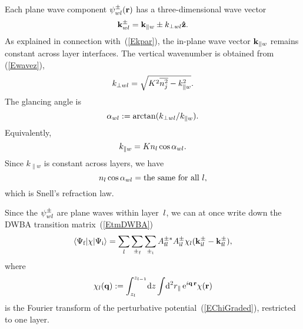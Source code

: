 Each plane wave component $\psi^\pm_{wl}(\mathbf{r})$ has
a three-dimensional wave vector
\begin{equation}\label{Ekpmwj3}
  \mathbf{k}^\pm_{wl}= \mathbf{k}_{\parallel w} \pm k_{\perp wl}\mathbf{\hat z}.
\end{equation}
%
%
As explained in connection with~(\ref{Ekpar}),
the in-plane wave vector $\mathbf{k}_{\parallel w}$ remains constant
across layer interfaces.
The vertical wavenumber is obtained from (\ref{Ewavez}),
\begin{equation}\label{Ekperpwj}
  k_{\perp wl} = \sqrt{K^2 \overline{n_j^2} - k_{\parallel w}^2}.
\end{equation}
The glancing angle is
\begin{equation}\label{Edef_alpha}
  \alpha_{wl}:=\arctan(k_{\perp wl}/k_{\parallel w}).  
\end{equation}
Equivalently,
\begin{equation}
  k_{\parallel w}=K n_l \cos\alpha_{wl}. 
\end{equation}
Since $k_{\parallel w}$ is constant across layers,
we have
\begin{equation}\label{ESnell}
  n_l \cos\alpha_{wl} = \text{the same for all }l,
\end{equation}
which is Snell's refraction law.

Since the $\psi^\pm_{wl}$ are plane waves within layer~$l$,
we can at once write down the DWBA transition matrix~(\ref{EtmDWBA})
%
\begin{equation}\label{EtmDWBAft0}
  \left\langle \Psi_{\text{f}}|\chi|\Psi_{\text{i}}\right\rangle
  = \sum_{l} \sum_{\pm_{\text{f}}} \sum_{\pm_{\text{i}}}
    A^{\pm *}_{\text{f} l} A^\pm_{\text{i} l} 
     \chi_l(\mathbf{k}^\pm_{\text{i} l}-\mathbf{k}^\pm_{\text{f} l}),
\end{equation}
where
\begin{equation}\label{Echij}
  \chi_l(\mathbf{q})
  := \int_{z_l}^{z_{l-1}}\!\text{d} z \int\!\text{d}^2r_\parallel\, \text{e}^{i\mathbf{q}\,\mathbf{r}}\chi(\mathbf{r})
\end{equation}
%
is the Fourier transform
of the perturbative potential~(\ref{EChiGraded}),
restricted to one layer.

